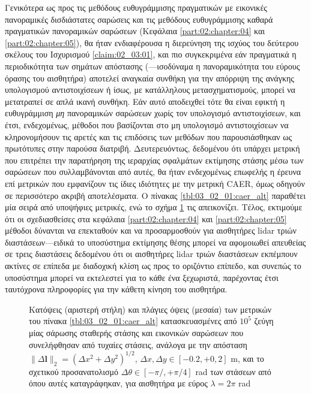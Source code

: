 Γενικότερα ως προς τις μεθόδους ευθυγράμμισης πραγματικών με εικονικές
πανοραμικές δισδιάστατες σαρώσεις και τις μεθόδους ευθυγράμμισης καθαρά
πραγματικών πανοραμικών σαρώσεων (Κεφάλαια \ref{part:02:chapter:04} και
\ref{part:02:chapter:05}), θα ήταν ενδιαφέρουσα η διερεύνηση της ισχύος του
δεύτερου σκέλους του Ισχυρισμού \ref{claim:02_03:01}, και πιο συγκεκριμένα εάν
πραγματικά η περιοδικότητα των σημάτων απόστασης (---ισοδύναμα η πανοραμικότητα
του εύρους όρασης του αισθητήρα) αποτελεί αναγκαία συνθήκη για την απόρριψη της
ανάγκης υπολογισμού αντιστοιχίσεων ή ίσως, με κατάλληλους μετασχηματισμούς,
μπορεί να μετατραπεί σε απλά ικανή συνθήκη. Εάν αυτό αποδειχθεί τότε θα είναι
εφικτή η ευθυγράμμιση \textit{μη} πανοραμικών σαρώσεων χωρίς τον υπολογισμό
αντιστοιχίσεων, και έτσι, ενδεχομένως, μέθοδοι που βασίζονται στο μη υπολογισμό
αντιστοιχίσεων να κληρονομήσουν τις αρετές και τις επιδόσεις των μεθόδων που
παρουσιάσθηκαν ως πρωτότυπες στην παρούσα διατριβή. Δευτερευόντως, δεδομένου
ότι υπάρχει μετρική που επιτρέπει την παρατήρηση της ιεραρχίας σφαλμάτων
εκτίμησης στάσης μέσω των σαρώσεων που συλλαμβάνονται από αυτές, θα ήταν
ενδεχομένως επωφελής η έρευνα επί μετρικών που εμφανίζουν τις ίδιες ιδιότητες
με την μετρική CAER, όμως οδηγούν σε περισσότερο ακριβή αποτελέσματα. Ο πίνακας
\ref{tbl:03_02_01:caer_alt} παραθέτει μία σειρά από υποψήφιες μετρικές, ενώ το
σχήμα \ref{fig:03_02_01:caer_alt} τις απεικονίζει. Τέλος, εκτιμούμε ότι οι
σχεδιασθείσες στα κεφάλαια \ref{part:02:chapter:04} και \ref{part:02:chapter:05}
μέθοδοι δύνανται να επεκταθούν και να προσαρμοσθούν για αισθητήρες lidar τριών
διαστάσεων---ειδικά το υποσύστημα εκτίμησης θέσης μπορεί να αφομοιωθεί
απευθείας σε τρεις διαστάσεις δεδομένου ότι οι αισθητήρες lidar τριών διαστάσεων
εκπέμπουν ακτίνες σε επίπεδα με διαδοχική κλίση ως προς το οριζόντιο επίπεδο,
και συνεπώς το υποσύστημα μπορεί να εκτελεστεί για το κάθε ένα ξεχωριστά,
παρέχοντας έτσι ταυτόχρονα πληροφορίες για την κάθετη κίνηση του αισθητήρα.

\begin{figure}\centering
  
  \vspace{1cm}
  \caption{\small Κατόψεις (αριστερή στήλη) και πλάγιες όψεις (μεσαία) των
           μετρικών του πίνακα \ref{tbl:03_02_01:caer_alt} κατασκευασμένες από
           $10^5$ ζεύγη μίας σάρωσης σταθερής στάσης και εικονικών σαρώσεων που
           συνελήφθησαν από τυχαίες στάσεις, ανάλογα με την απόσταση $\|\Delta
           \bm{l}\|_2 = (\Delta x^2 + \Delta y^2)^{1/2}$, $\Delta x, \Delta y
           \in [-0.2, +0,2]$ m, και το σχετικού προσανατολισμό $\Delta \theta
           \in [-\pi/, +\pi/4]$ rad των στάσεων από όπου αυτές καταγράφηκαν,
           για αισθητήρα με εύρος $\lambda = 2\pi$ rad}
  \label{fig:03_02_01:caer_alt}
\end{figure}


